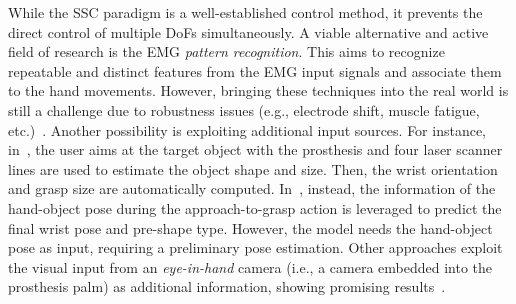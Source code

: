  While the SSC paradigm is a well-established control method, it prevents the direct control of multiple DoFs simultaneously.
A viable alternative and active field of research is the EMG \textit{pattern recognition}. This aims to recognize repeatable and distinct features from the EMG input signals and associate them to the hand movements. However, bringing these techniques into the real world is still a challenge due to robustness issues (e.g., electrode shift, muscle fatigue, etc.)~\cite{chen2023}. Another possibility is exploiting additional input sources. For instance, in~\cite{castro2022semi}, the user aims at the target object with the prosthesis and four laser scanner lines are used to estimate the object shape and size. Then, the wrist orientation and grasp size are automatically computed. In~\cite{shi2023hand}, instead, the information of the hand-object pose during the approach-to-grasp action is leveraged to predict the final wrist pose and pre-shape type. However, the model needs the hand-object pose as input, requiring a preliminary pose estimation. 
Other approaches exploit the visual input from an \textit{eye-in-hand} camera (i.e., a camera embedded into the prosthesis palm) as additional information, showing promising results~\cite{vasile2022, starke2022, robotics12060152, shi2022target}. 
